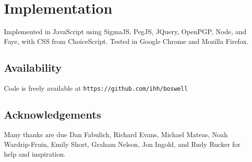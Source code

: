 \documentclass{acm_proc_article-sp}
\begin{document}
\section{Implementation}

Implemented in JavaScript
using SigmaJS, PegJS, JQuery, OpenPGP, Node, and Faye,
with CSS from ChoiceScript.
Tested in Google Chrome and Mozilla Firefox.



\subsection{Availability}

Code is freely available at
{\tt https://github.com/ihh/boswell}


\subsection{Acknowledgements}

Many thanks are due Dan Fabulich, Richard Evans, Michael Mateas, Noah Wardrip-Fruin,
Emily Short, Graham Nelson, Jon Ingold,
and Rudy Rucker for help and inspiration.




\balancecolumns
\end{document}
